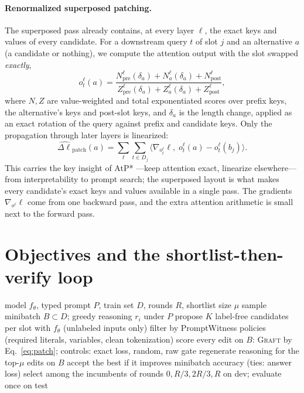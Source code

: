 \documentclass{article}
\newcommand{\graft}{\textsc{Graft}}
\begin{document}
\paragraph{Renormalized superposed patching.} The superposed pass already contains,
at every layer $\ell$, the exact keys and values of every candidate. For a
downstream query $t$ of slot $j$ and an alternative $a$ (a candidate or nothing), we
compute the attention output with the slot swapped \emph{exactly},
\begin{equation}
o^{\ell}_t(a)=\frac{N^{\ell}_{\mathrm{pre}}(\delta_a)+N^{\ell}_a(\delta_a)+N^{\ell}_{\mathrm{post}}}
{Z^{\ell}_{\mathrm{pre}}(\delta_a)+Z^{\ell}_a(\delta_a)+Z^{\ell}_{\mathrm{post}}},
\end{equation}
where $N,Z$ are value-weighted and total exponentiated scores over prefix keys,
the alternative's keys and post-slot keys, and $\delta_a$ is the length change,
applied as an exact rotation of the query against prefix and candidate keys.
Only the propagation through later layers is linearized:
\begin{equation}
\widehat{\Delta\ell}_{\text{patch}}(a)=\sum_{\ell}\sum_{t\in D_j}
\big\langle \nabla_{o^{\ell}_t}\ell,\; o^{\ell}_t(a)-o^{\ell}_t(b_j)\big\rangle .
\label{eq:patch}
\end{equation}
This carries the key insight of AtP* \citep{kramar2024atp}---keep attention exact,
linearize elsewhere---from interpretability to prompt search; the superposed
layout is what makes every candidate's exact keys and values available in a single
pass. The gradients $\nabla_{o^\ell}\ell$ come from one backward pass, and the extra
attention arithmetic is small next to the forward pass.

\section{Objectives and the shortlist-then-verify loop}
\label{sec:graft}

\begin{algorithm}[t]
\caption{Structural shortlist-then-verify search (\graft{} and its controls)}
\label{alg:graft}
\begin{algorithmic}[1]
\Require model $f_\theta$, typed prompt $P$, train set $D$, rounds $R$, shortlist size $\mu$
  \State sample minibatch $B\subset D$; greedy reasoning $r_i$ under $P$
  \State propose $K$ label-free candidates per slot with $f_\theta$ (unlabeled inputs only)
  \State filter by PromptWitness policies (required literals, variables, clean tokenization)
  \State score every edit on $B$: \graft{} by Eq.~\ref{eq:patch}; controls: exact loss, random, raw gate
  \State regenerate reasoning for the top-$\mu$ edits on $B$
  \State accept the best if it improves minibatch accuracy (ties: answer loss)
\EndFor
\State select among the incumbents of rounds $0,R/3,2R/3,R$ on dev; evaluate once on test
\end{algorithmic}
\end{algorithm}
\end{document}
